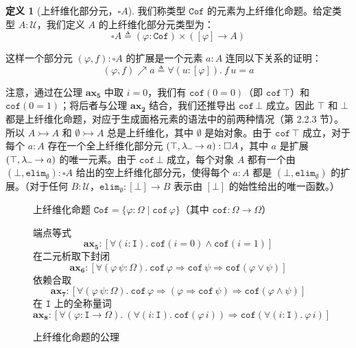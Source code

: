 \documentclass{ctexrep}
\theoremstyle{plain}
\theoremstyle{definition}
\newtheorem{definition}[theorem]{定义}
\theoremstyle{remark}
\newcommand{\Cof}{\mathtt{Cof}}
\newcommand{\ax}[1]{\mathbf{ax_{#1}}}
\newcommand{\ul}{{\rule[0ex]{0.5em}{0.4pt}}} %
\begin{document}
\begin{definition}[上纤维化部分元，$\square A$]
我们称类型 $\Cof$ 的元素为上纤维化命题。给定类型 $A : \mathcal{U}$，我们定义 $A$ 的上纤维化部分元类型为：
\begin{equation}
\square A \triangleq (\varphi : \Cof) \times ([\varphi] \to A)
\end{equation}

这样一个部分元 $(\varphi, f) : \square A$ 的扩展是一个元素 $a : A$ 连同以下关系的证明：
\begin{equation}
(\varphi, f) \nearrow a \triangleq \forall(u : [\varphi]).\ f\,u = a
\end{equation}
\end{definition}

注意，通过在公理 $\ax{5}$ 中取 $i = 0$，我们有 $\mathtt{cof}(0 = 0)$（即 $\mathtt{cof}\,\top$）和 $\mathtt{cof}(0 = 1)$；将后者与公理 $\ax{2}$ 结合，我们还推导出 $\mathtt{cof}\,\bot$ 成立。因此 $\top$ 和 $\bot$ 都是上纤维化命题，对应于生成面格元素的语法中的前两种情况（第 2.2.3 节）。所以 $A \rightarrowtail A$ 和 $\emptyset \rightarrowtail A$ 总是上纤维化，其中 $\emptyset$ 是始对象。由于 $\mathtt{cof}\,\top$ 成立，对于每个 $a : A$ 存在一个全上纤维化部分元 $(\top, \lambda\ul  \to a) : \square A$，其中 $a$ 是扩展 $(\top, \lambda\ul  \to a)$ 的唯一元素。由于 $\mathtt{cof}\,\bot$ 成立，每个对象 $A$ 都有一个由 $(\bot, \mathtt{elim}_\emptyset) : \square A$ 给出的空上纤维化部分元，使得每个 $a : A$ 都是 $(\bot, \mathtt{elim}_\emptyset)$ 的扩展。（对于任何 $B : \mathcal{U}$，$\mathtt{elim}_\emptyset : [\bot] \to B$ 表示由 $[\bot]$ 的始性给出的唯一函数。）

\begin{figure}[htbp]
\centering

上纤维化命题 $\Cof = \{\varphi : \Omega \mid \mathtt{cof}\,\varphi\}$（其中 $\mathtt{cof} : \Omega \to \Omega$）

端点等式
\[
\ax{5} : [\forall(i : \mathtt{I}).\ \mathtt{cof}(i = 0) \land \mathtt{cof}(i = 1)]
\]
在二元析取下封闭
\[
\ax{6} : [\forall(\varphi\,\psi : \Omega).\ \mathtt{cof}\,\varphi \Rightarrow \mathtt{cof}\,\psi \Rightarrow \mathtt{cof}(\varphi \lor \psi)]
\]
依赖合取
\[
\ax{7} : [\forall(\varphi\,\psi : \Omega).\ \mathtt{cof}\,\varphi \Rightarrow (\varphi \Rightarrow \mathtt{cof}\,\psi) \Rightarrow \mathtt{cof}(\varphi \land \psi)]
\]
在 $\mathtt{I}$ 上的全称量词
\[
\ax{8} : [\forall(\varphi : \mathtt{I} \to \Omega).\ (\forall(i : \mathtt{I}).\ \mathtt{cof}(\varphi\,i)) \Rightarrow \mathtt{cof}(\forall(i : \mathtt{I}).\ \varphi\,i)]
\]

\caption{上纤维化命题的公理}
\label{fig:cofibrant-axioms}

\end{figure}
\end{document}
